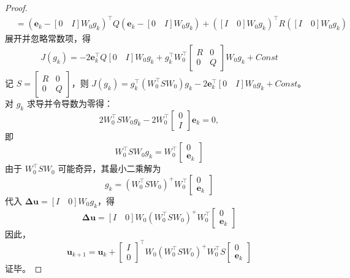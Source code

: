 \begin{proof}
\begin{align*}
		&= \left( \mathbf{e}_k - [0 \quad I] W_0 g_k \right)^\top Q \left( \mathbf{e}_k - [0 \quad I] W_0 g_k \right) + \left( [I \quad 0] W_0 g_k \right)^\top R \left( [I \quad 0] W_0 g_k \right)
	\end{align*}
	展开并忽略常数项，得
	\[
	J(g_k) = -2 \mathbf{e}_k^\top Q [0 \quad I] W_0 g_k + g_k^\top W_0^\top \begin{bmatrix} R & 0 \\ 0 & Q \end{bmatrix} W_0 g_k + Const
	\]
	记 \( S = \begin{bmatrix} R & 0 \\ 0 & Q \end{bmatrix} \)，则 \( J(g_k) = g_k^\top (W_0^\top S W_0) g_k - 2 \mathbf{e}_k^\top [0 \quad I] W_0 g_k + Const \)。对 \( g_k \) 求导并令导数为零得：
	\[
	2 W_0^\top S W_0 g_k - 2 W_0^\top \begin{bmatrix} 0 \\ I \end{bmatrix} \mathbf{e}_k = 0,
	\]
	即
	\[
	W_0^\top S W_0 g_k = W_0^\top \begin{bmatrix} 0 \\ \mathbf{e}_k \end{bmatrix}
	\]
	由于 \( W_0^\top S W_0 \) 可能奇异，其最小二乘解为
	\[
	g_k = (W_0^\top S W_0)^+ W_0^\top \begin{bmatrix} 0 \\ \mathbf{e}_k \end{bmatrix}
	\]
	代入 \( \mathbf{\Delta u} = [I \quad 0] W_0 g_k \)，得
	\begin{equation}
		\mathbf{\Delta u} = [I \quad 0] W_0 (W_0^\top S W_0)^+ W_0^\top \begin{bmatrix} 0 \\ \mathbf{e}_k \end{bmatrix}
		\label{eq:delta_u}
	\end{equation}
	因此，
	\begin{equation}
		\mathbf{u}_{k+1} = \mathbf{u}_k + \begin{bmatrix} I \\ 0 \end{bmatrix}^\top W_0 (W_0^\top S W_0)^+ W_0^\top S \begin{bmatrix} 0 \\ \mathbf{e}_k \end{bmatrix}
		\label{eq:solution_step}
	\end{equation}
	证毕。
\end{proof}

